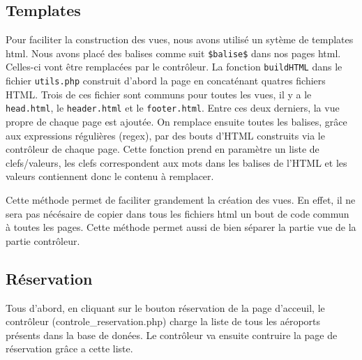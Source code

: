 \documentclass[12pt,a4paper]{article}
\begin{document}
		\subsection*{Templates}
		Pour faciliter la construction des vues, nous avons utilisé un sytème de templates html. Nous avons placé des balises comme suit \texttt{\$balise\$} dans nos pages html. Celles-ci vont être remplacées par le contrôleur. La fonction \texttt{buildHTML} dans le fichier \texttt{utils.php} construit d'abord la page en concaténant quatres fichiers HTML. Trois de ces fichier sont communs pour toutes les vues, il y a le \texttt{head.html}, le \texttt{header.html} et le \texttt{footer.html}.  Entre ces deux derniers, la vue propre de chaque page est ajoutée.
		On remplace ensuite toutes les balises, grâce aux expressions régulières (regex), par des bouts d'HTML construits via le contrôleur de chaque page. Cette fonction prend en paramètre un liste de clefs/valeurs, les clefs correspondent aux mots dans les balises de l'HTML et les valeurs contiennent donc le contenu à remplacer.

		Cette méthode permet de faciliter grandement la création des vues. En effet, il ne sera pas nécésaire de copier dans tous les fichiers html un bout de code commun à toutes les pages. Cette méthode permet aussi de bien séparer la partie vue de la partie contrôleur.

		\subsection{Réservation}
      Tous d'abord, en cliquant sur le bouton réservation de la page d'acceuil, le contrôleur (controle\_reservation.php) charge la liste de tous les aéroports présents dans la base de donées. Le contrôleur va ensuite contruire la page de réservation grâce a cette liste.
\end{document}
